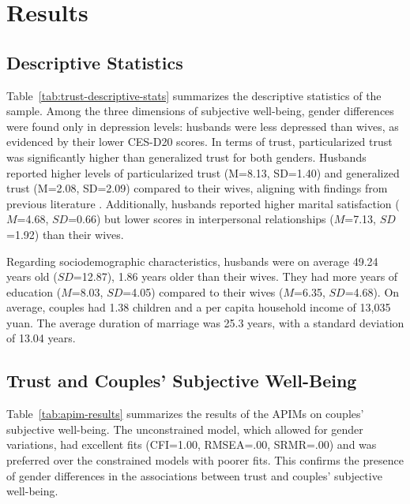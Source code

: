 \section{Results}
\label{sec:ch4-results}

\subsection{Descriptive Statistics}

Table~\ref{tab:trust-descriptive-stats} summarizes the descriptive statistics of the sample. Among the three dimensions of subjective well-being, gender differences were found only in depression levels: husbands were less depressed than wives, as evidenced by their lower CES-D20 scores. In terms of trust, particularized trust was significantly higher than generalized trust for both genders. Husbands reported higher levels of particularized trust (M=8.13, SD=1.40) and generalized trust (M=2.08, SD=2.09) compared to their wives, aligning with findings from previous literature \parencite{delheyHowGeneralTrust2011,sungIngroupTrustSelfrated2020}. Additionally, husbands reported higher marital satisfaction ($M$=4.68, $SD$=0.66) but lower scores in interpersonal relationships ($M$=7.13, $SD$=1.92) than their wives.

Regarding sociodemographic characteristics, husbands were on average 49.24 years old ($SD$=12.87), 1.86 years older than their wives. They had more years of education ($M$=8.03, $SD$=4.05) compared to their wives ($M$=6.35, $SD$=4.68). On average, couples had 1.38 children and a per capita household income of 13,035 yuan. The average duration of marriage was 25.3 years, with a standard deviation of 13.04 years.

\subsection{Trust and Couples' Subjective Well-Being}

Table~\ref{tab:apim-results} summarizes the results of the APIMs on couples' subjective well-being. The unconstrained model, which allowed for gender variations, had excellent fits (CFI=1.00, RMSEA=.00, SRMR=.00) and was preferred over the constrained models with poorer fits. This confirms the presence of gender differences in the associations between trust and couples' subjective well-being.

